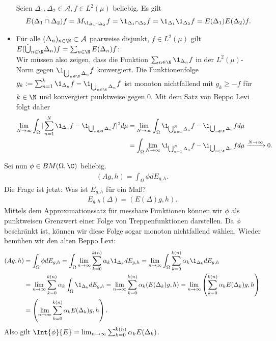 \begin{solution}
\begin{itemize}
  Seien $\Delta_1,\Delta_2 \in \mathcal{A}, f \in L^2(\mu)$ beliebig. Es gilt
  \begin{align*}
    E(\Delta_1 \cap \Delta_2)f = M_{\1_{\Delta_1 \cap \Delta_2}}f
    = \1_{\Delta_1 \cap \Delta_2}f = \1_{\Delta_1}\1_{\Delta_2}f
    = E(\Delta_1)E(\Delta_2)f.
  \end{align*}
  \item Für alle $(\Delta_n)_{n \in \N} \subset \mathcal{A}$ paarweise disjunkt, $f \in L^2(\mu)$ gilt $E(\dot\bigcup_{n \in \N}\Delta_n)f = \sum_{n \in \N}E(\Delta_n)f$: \\
  Wir müssen also zeigen, dass die Funktion $\sum_{n \in \N}\1_{\Delta_n}f$
  in der $L^2(\mu)$-Norm gegen $\1_{\bigcup_{n \in \N}\Delta_n}f$ konvergiert.
  Die Funktionenfolge $g_k := \sum_{n = 1}^k\1_{\Delta_n}f - \1_{\bigcup_{n \in \N}\Delta_n}f$ ist monoton nichtfallend mit $g_k \geq -f$ für $k \in \N$
  und konvergiert punktweise gegen $0$.
  Mit dem Satz von Beppo Levi folgt daher
  \begin{align*}
  \lim_{N \to \infty}\int_\Omega |\sum_{n = 1}^N\1_{\Delta_n}f - \1_{\bigcup_{n \in \N}\Delta_n}f|^2 d\mu
  &= \lim_{N \to \infty}\int_\Omega \1_{\bigcup_{n = 1}^N\Delta_n}f -
  \1_{\bigcup_{n \in \N}\Delta_n}f
   d\mu \\
  &= \int_\Omega \lim_{N \to \infty} \1_{\bigcup_{n = 1}^N\Delta_n}f -
  \1_{\bigcup_{n \in \N}\Delta_n}f d\mu \xrightarrow{N \to \infty} 0.
  \end{align*}
\end{itemize}
Sei nun $\phi \in BM(\Omega,\C)$ beliebig.
\begin{align*}
  (Ag,h) = \int_{\Omega}\phi dE_{g,h}.
\end{align*}
Die Frage ist jetzt: Was ist $E_{g,h}$ für ein Maß?
\begin{align*}
  E_{g,h}(\Delta) = (E(\Delta)g,h).
\end{align*}
Mittels dem Approximationssatz für messbare Funktionen können wir $\phi$
als punktweisen Grenzwert einer Folge von Treppenfunktionen darstellen.
Da $\phi$ beschränkt ist, können wir diese Folge sogar monoton nichtfallend wählen.
Wieder bemühen wir den alten Beppo Levi:
\begin{align*}
  (Ag,h) &= \int_{\Omega}\phi dE_{g,h} = \int_{\Omega}\lim_{n \to \infty}
  \sum_{k=0}^{k(n)}\alpha_k\1_{\Delta_k} dE_{g,h}
  = \lim_{n \to \infty}\int_{\Omega}\sum_{k=0}^{k(n)}\alpha_k\1_{\Delta_k} dE_{g,h} \\
  &= \lim_{n \to \infty}\sum_{k=0}^{k(n)}\alpha_k\int_{\Omega}\1_{\Delta_k} dE_{g,h}
  = \lim_{n \to \infty}\sum_{k=0}^{k(n)}\alpha_k(E(\Delta_k)g,h)
  = \lim_{n \to \infty}\left(\sum_{k=0}^{k(n)}\alpha_kE(\Delta_k)g,h\right) \\
  &= \left(\lim_{n \to \infty}\sum_{k=0}^{k(n)}\alpha_kE(\Delta_k)g,h\right).
\end{align*}
Also gilt $\Int{\phi}{E} = \lim_{n \to \infty}\sum_{k=0}^{k(n)}\alpha_kE(\Delta_k)$.


\end{solution}
